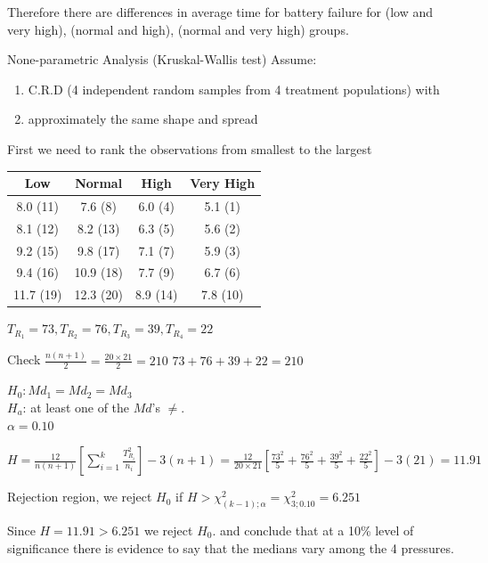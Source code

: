\documentclass{article}
\begin{document}
\begin{enumerate}[1.]
\begin{enumerate}[1)]
Therefore there are differences in average time for battery failure for (low and very high), (normal and high), (normal and very high) groups.

\end{enumerate}

None-parametric Analysis (Kruskal-Wallis test)
Assume:
\begin{enumerate}[1)]
\item C.R.D (4 independent random samples from 4 treatment populations) with
\item approximately the same shape and spread
\end{enumerate}

First we need to rank the observations from smallest to the largest


\begin{center}
 \begin{tabular}{||c c c c||} 
 \hline
Low & Normal & High & Very High \\ [0.5ex] 
 \hline\hline
8.0 (11) & 7.6 (8) & 6.0 (4) & 5.1 (1) \\
 \hline
8.1 (12) & 8.2 (13) & 6.3 (5) & 5.6 (2) \\
 \hline
9.2 (15) & 9.8 (17) & 7.1 (7) & 5.9 (3) \\
 \hline
9.4 (16) & 10.9 (18) & 7.7 (9) & 6.7 (6) \\
 \hline
11.7  (19) & 12.3 (20) & 8.9 (14) & 7.8 (10) \\ [1ex]
 \hline
\end{tabular}
\end{center}

$T_{R_1} = 73, T_{R_2} = 76, T_{R_3} = 39, T_{R_4} = 22$

Check $\frac{n(n+1)}{2} = \frac{20\times21}{2} = 210$
$73 + 76 + 39 + 22 = 210$

$H_0: Md_1 = Md_2 = Md_3$ \\
$H_a$: at least one of the $Md$'s $\neq$. \\
$\alpha = 0.10$

$H = \frac{12}{n(n+1)}[\sum_{i=1}^{k}{ \frac{T_{R_i}^2}{n_i}}] - 3(n+1) = \frac{12}{20\times21}[\frac{73^2}{5} + \frac{76^2}{5} + \frac{39^2}{5} + \frac{22^2}{5} ] - 3(21) = 11.91$

Rejection region, we reject $H_0$ if $H > \chi_{(k-1);\alpha}^2 = \chi_{3; 0.10}^2 = 6.251$

Since $H = 11.91 > 6.251$ we reject $H_0$. and conclude that at a 10\% level of significance there is evidence to say that the medians vary among the 4 pressures.


\end{enumerate}
\end{document}
